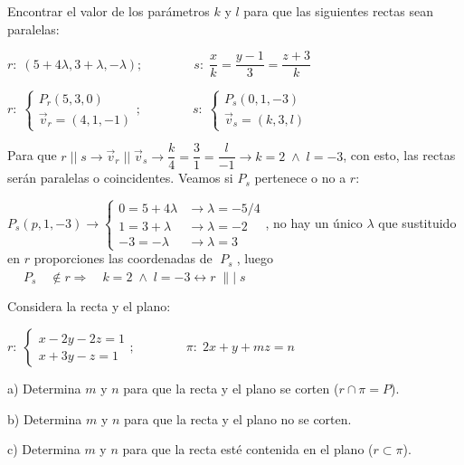 \begin{ejre}
	Encontrar el valor de los parámetros $k$ y $l$ para que las siguientes rectas sean paralelas:
	
	$r:\; (5+4\lambda,3+\lambda,-\lambda);\qquad \qquad s:\; \dfrac{x}{k}=\dfrac{y-1}{3}=\dfrac{z+3}{k}$
\end{ejre}

\begin{proofw}\renewcommand{\qedsymbol}{$\diamond$}
	$r:\; \begin{cases} P_r(5,3,0) \\ \vec v_r=(4,1,-1)\end{cases}; \qquad \qquad s:\; \begin{cases} P_s(0,1,-3) \\ \vec v_s=(k,3,l) \end{cases}$
	
\noindent Para que $r\;||\; s \to \vec v_r\;||\;\vec v_s \to \dfrac{k}{4}=\dfrac{3}{1}=\dfrac{l}{-1} \to k=2 \;\wedge \; l=-3$, con esto, las rectas serán paralelas o coincidentes. Veamos si $P_s$ pertenece o no a $r$: 

\noindent $P_s(p,1,-3)\to \begin{cases} 0=5+4\lambda &\to \lambda=-5/4 \\ 1=3+\lambda &\to \lambda=-2 \\ -3=-\lambda &\to \lambda=3 \end{cases}$, no hay un único $\lambda$ que sustituido en $r$ proporciones las coordenadas de $\;P_s\;$, luego $\quad \;P_s \quad \notin r \Rightarrow \quad k=2 \;\wedge \; l=-3 \leftrightarrow r\;\||\;s$ 
\end{proofw}

\begin{ejre}
	Considera la recta y el plano:
	
	$r:\; \begin{cases} x-2y-2z=1\\x+3y-z=1 \end{cases}; \qquad \qquad \pi:\; 2x+y+mz=n$
	
	a) Determina $m$ y $n$ para que la recta y el plano se corten ($r\cap \pi=P$).
	
	b) Determina $m$ y $n$ para que la recta y el plano no se corten.
	
	c) Determina $m$ y $n$ para que la recta esté contenida en el plano 
	($r\subset \pi$).
\end{ejre}

